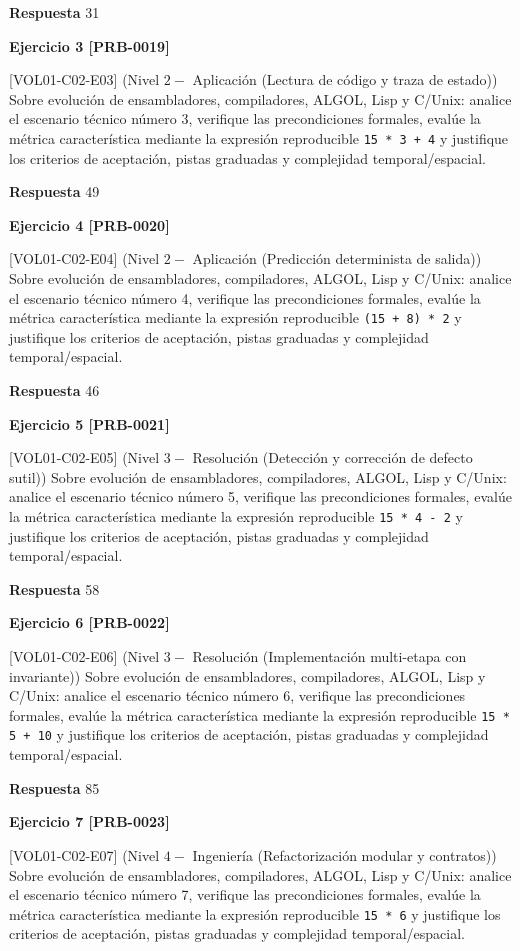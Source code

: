 \documentclass{book}
\begin{document}
\noindent\textbf{Respuesta} 31

\noindent\textbf{Ejercicio 3 [PRB-0019]}

[VOL01-C02-E03] (Nivel \(2 -\) Aplicación (Lectura de código y traza de estado)) Sobre evolución de ensambladores, compiladores, ALGOL, Lisp y C/Unix: analice el escenario técnico número 3, verifique las precondiciones formales, evalúe la métrica característica mediante la expresión reproducible \texttt{15 * 3 + 4} y justifique los criterios de aceptación, pistas graduadas y complejidad temporal/espacial.

\noindent\textbf{Respuesta} 49

\noindent\textbf{Ejercicio 4 [PRB-0020]}

[VOL01-C02-E04] (Nivel \(2 -\) Aplicación (Predicción determinista de salida)) Sobre evolución de ensambladores, compiladores, ALGOL, Lisp y C/Unix: analice el escenario técnico número 4, verifique las precondiciones formales, evalúe la métrica característica mediante la expresión reproducible \texttt{(15 + 8) * 2} y justifique los criterios de aceptación, pistas graduadas y complejidad temporal/espacial.

\noindent\textbf{Respuesta} 46

\noindent\textbf{Ejercicio 5 [PRB-0021]}

[VOL01-C02-E05] (Nivel \(3 -\) Resolución (Detección y corrección de defecto sutil)) Sobre evolución de ensambladores, compiladores, ALGOL, Lisp y C/Unix: analice el escenario técnico número 5, verifique las precondiciones formales, evalúe la métrica característica mediante la expresión reproducible \texttt{15 * 4 - 2} y justifique los criterios de aceptación, pistas graduadas y complejidad temporal/espacial.

\noindent\textbf{Respuesta} 58

\noindent\textbf{Ejercicio 6 [PRB-0022]}

[VOL01-C02-E06] (Nivel \(3 -\) Resolución (Implementación multi-etapa con invariante)) Sobre evolución de ensambladores, compiladores, ALGOL, Lisp y C/Unix: analice el escenario técnico número 6, verifique las precondiciones formales, evalúe la métrica característica mediante la expresión reproducible \texttt{15 * 5 + 10} y justifique los criterios de aceptación, pistas graduadas y complejidad temporal/espacial.

\noindent\textbf{Respuesta} 85

\noindent\textbf{Ejercicio 7 [PRB-0023]}

[VOL01-C02-E07] (Nivel \(4 -\) Ingeniería (Refactorización modular y contratos)) Sobre evolución de ensambladores, compiladores, ALGOL, Lisp y C/Unix: analice el escenario técnico número 7, verifique las precondiciones formales, evalúe la métrica característica mediante la expresión reproducible \texttt{15 * 6} y justifique los criterios de aceptación, pistas graduadas y complejidad temporal/espacial.
\end{document}
